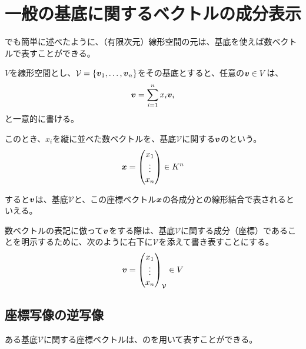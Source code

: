 \documentclass[../../../topic_linear-algebra]{subfiles}
\begin{document}
\sectionline
\section{一般の基底に関するベクトルの成分表示}

でも簡単に述べたように、（有限次元）線形空間の元は、基底を使えば数ベクトルで表すことができる。

\br

$V$を線形空間とし、$\mathcal{V} = \{\vb*{v}_1, \ldots, \vb*{v}_n\}$をその基底とすると、任意の$\vb*{v} \in V$は、
\begin{equation*}
  \vb*{v} = \sum_{i=1}^n x_i \vb*{v}_i
\end{equation*}
と一意的に書ける。

\br

このとき、$x_i$を縦に並べた数ベクトルを、基底$\mathcal{V}$に関する$\vb*{v}$のという。
\begin{equation*}
  \vb*{x} = \begin{pmatrix}
    x_1 \\
    \vdots \\
    x_n
  \end{pmatrix} \in K^n
\end{equation*}

すると$\vb*{v}$は、基底$\mathcal{V}$と、この座標ベクトル$\vb*{x}$の各成分との線形結合で表されるといえる。

\br

数ベクトルの表記に倣って$\vb*{v}$をする際は、基底$\mathcal{V}$に関する成分（座標）であることを明示するために、次のように右下に$\mathcal{V}$を添えて書き表すことにする。
\begin{equation*}
  \vb*{v} = \begin{pmatrix}
    x_1    \\
    \vdots \\
    x_n
  \end{pmatrix}_{\mathcal{V}} \in V
\end{equation*}

\subsection{座標写像の逆写像}

ある基底$\mathcal{V}$に関する座標ベクトルは、のを用いて表すことができる。
\end{document}
